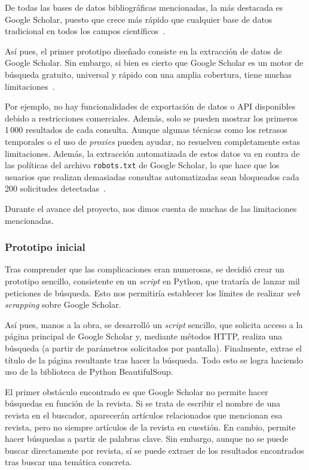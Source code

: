 De todas las bases de datos bibliográficas mencionadas, la más destacada es Google Scholar, puesto que crece más rápido que cualquier base de datos tradicional en todos los campos científicos~\cite{harzing2010, lopez2017}.

Así pues, el primer prototipo diseñado consiste en la extracción de datos de Google Scholar. Sin embargo, si bien es cierto que Google Scholar es un motor de búsqueda gratuito, universal y rápido con una amplia cobertura, tiene muchas limitaciones~\cite{lopez2017}. 


Por ejemplo, no hay funcionalidades de exportación de datos o API disponibles debido a restricciones comerciales. Además, solo se pueden mostrar los primeros 1\,000 resultados de cada consulta. Aunque algunas técnicas como los retrasos temporales o el uso de \textit{proxies} pueden ayudar, no resuelven completamente estas limitaciones. Además, la extracción automatizada de estos datos va en contra de las políticas del archivo \texttt{robots.txt} de Google Scholar, lo que hace que los usuarios que realizan demasiadas consultas automatizadas sean bloqueados cada 200 solicitudes detectadas~\cite{lopez2017}.

Durante el avance del proyecto, nos dimos cuenta de muchas de las limitaciones mencionadas.

\subsubsection{Prototipo inicial}

Tras comprender que las complicaciones eran numerosas, se decidió crear un prototipo sencillo, consistente en un \textit{script} en Python, que trataría de lanzar mil peticiones de búsqueda. Esto nos permitiría establecer los límites de realizar \textit{web scrapping} sobre Google Scholar.

Así pues, manos a la obra, se desarrolló un \textit{script} sencillo, que solicita acceso a la página principal de Google Scholar y, mediante métodos HTTP, realiza una búsqueda (a partir de parámetros solicitados por pantalla). Finalmente, extrae el título de la página resultante tras hacer la búsqueda. Todo esto se logra haciendo uso de la biblioteca de Python BeautifulSoup.


El primer obstáculo encontrado es que Google Scholar no permite hacer búsquedas en función de la revista. Si se trata de escribir el nombre de una revista en el buscador, aparecerán artículos relacionados que mencionan esa revista, pero no siempre artículos de la revista en cuestión. En cambio, permite hacer búsquedas a partir de palabras clave.
Sin embargo, aunque no se puede buscar directamente por revista, sí se puede extraer de los resultados encontrados tras buscar una temática concreta.

